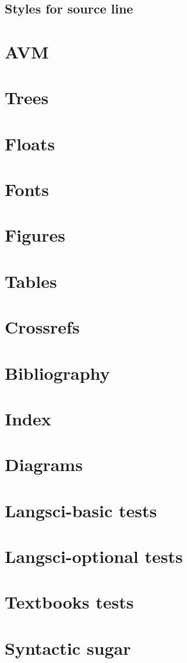 \documentclass[output=book
	      ,nonflat
	      ,modfonts,
	      ,colorlinks
	      ,biblatex
	      ,showindex
	      ]{langsci/langscibook}
\begin{document}
\subsection{Styles for source line}



\section{AVM}
\section{Trees}

\section{Floats}
 
 

\section{Fonts}

%  
\section{Figures}\label{sec:tables}

\section{Tables}\label{sec:tables}

\section{Crossrefs}

\section{Bibliography}
 
\section{Index}
 
\section{Diagrams}
\section{Langsci-basic tests}
\section{Langsci-optional tests}
\section{Textbooks tests}
 
 
 
\section{Syntactic sugar}
 

\end{document}
